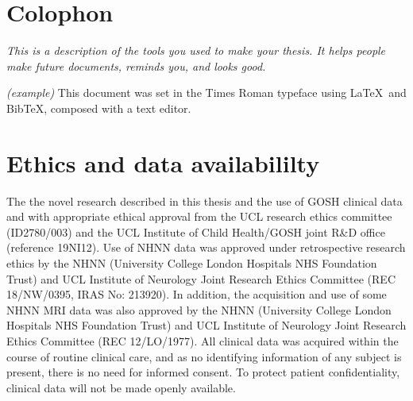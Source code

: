\chapter{Colophon}
\label{appendixlabel3}
\textit{This is a description of the tools you used to make your thesis. It helps people make future documents, reminds you, and looks good.}

\textit{(example)} This document was set in the Times Roman typeface using \LaTeX\ and Bib\TeX , composed with a text editor.


\chapter{Ethics and data availabililty}

The the novel research described in this thesis and the use of GOSH clinical data and with appropriate ethical approval from the UCL research ethics committee (ID2780/003) and the UCL Institute of Child Health/GOSH joint R\&D office (reference 19NI12).
Use of NHNN data was approved under retrospective research ethics by the NHNN (University College London Hospitals NHS Foundation Trust) and UCL Institute of Neurology Joint Research Ethics Committee (REC 18/NW/0395, IRAS No: 213920).
In addition, the acquisition and use of some NHNN MRI data was also approved by the NHNN (University College London Hospitals NHS Foundation Trust) and UCL Institute of Neurology Joint Research Ethics Committee (REC 12/LO/1977).
All clinical data was acquired within the course of routine clinical care, and as no identifying information of any subject is present, there is no need for informed consent.
To protect patient confidentiality, clinical data will not be made openly available.
